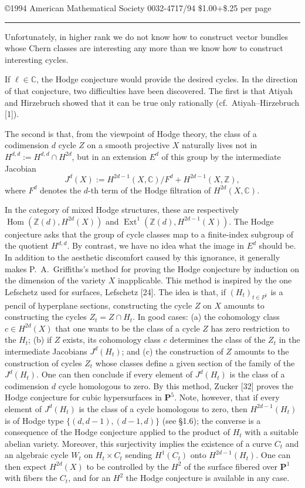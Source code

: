 \documentclass[11pt,a4paper]{article}
\theoremstyle{plain}
\theoremstyle{definition}
\DeclareMathOperator{\Ext}{Ext}
\DeclareMathOperator{\Hom}{Hom}
\newcommand{\Z}{\mathbb{Z}}
\newcommand{\C}{\mathbb{C}}
\begin{document}
\noindent\copyright 1994 American Mathematical Society
\hfill 0032-4717/94 \$1.00+\$.25 per page

\vspace{0.5em}
\noindent\rule{\textwidth}{0.4pt}

Unfortunately, in higher rank we do not know how to construct vector bundles whose Chern classes are interesting any more than we know how to construct interesting cycles.

If $\ell \in \C$, the Hodge conjecture would provide the desired cycles. In the direction of that conjecture, two difficulties have been discovered. The first is that Atiyah and Hirzebruch showed that it can be true only rationally (cf.~Atiyah--Hirzebruch [1]).

The second is that, from the viewpoint of Hodge theory, the class of a codimension $d$ cycle $Z$ on a smooth projective $X$ naturally lives not in $H^{d,d}:=H^{d,d}\cap H^{2d}$, but in an extension $E^d$ of this group by the intermediate Jacobian
$$
J^d(X):=H^{2d-1}(X,\C)/F^d+H^{2d-1}(X,\Z),
$$
where $F^d$ denotes the $d$-th term of the Hodge filtration of $H^{2d}(X,\C)$.

In the category of mixed Hodge structures, these are respectively
$\Hom(\Z(d),H^{2d}(X))$ and $\Ext^1(\Z(d),H^{2d-1}(X))$. The Hodge conjecture asks that the group of cycle classes map to a finite-index subgroup of the quotient $H^{d,d}$. By contrast, we have no idea what the image in $E^d$ should be. In addition to the aesthetic discomfort caused by this ignorance, it generally makes P.~A.~Griffiths's method for proving the Hodge conjecture by induction on the dimension of the variety $X$ inapplicable. This method is inspired by the one Lefschetz used for surfaces, Lefschetz [24]. The idea is that, if $(H_t)_{t\in P^1}$ is a pencil of hyperplane sections, constructing the cycle $Z$ on $X$ amounts to constructing the cycles $Z_t=Z\cap H_t$. In good cases: (a) the cohomology class $c\in H^{2d}(X)$ that one wants to be the class of a cycle $Z$ has zero restriction to the $H_t$; (b) if $Z$ exists, its cohomology class $c$ determines the class of the $Z_t$ in the intermediate Jacobians $J^d(H_t)$; and (c) the construction of $Z$ amounts to the construction of cycles $Z_t$ whose classes define a given section of the family of the $J^d(H_t)$. One can then conclude if every element of $J^d(H_t)$ is the class of a codimension $d$ cycle homologous to zero. By this method, Zucker [32] proves the Hodge conjecture for cubic hypersurfaces in $\mathbf{P}^5$. Note, however, that if every element of $J^d(H_t)$ is the class of a cycle homologous to zero, then $H^{2d-1}(H_t)$ is of Hodge type $\{(d,d-1),(d-1,d)\}$ (see \S1.6); the converse is a consequence of the Hodge conjecture applied to the product of $H_t$ with a suitable abelian variety. Moreover, this surjectivity implies the existence of a curve $C_t$ and an algebraic cycle $W_t$ on $H_t\times C_t$ sending $H^1(C_t)$ onto $H^{2d-1}(H_t)$. One can then expect $H^{2d}(X)$ to be controlled by the $H^2$ of the surface fibered over $\mathbf{P}^1$ with fibers the $C_t$, and for an $H^2$ the Hodge conjecture is available in any case.
\end{document}
